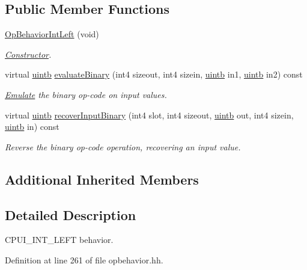 \subsection*{Public Member Functions}
\begin{DoxyCompactItemize}
\item 
\mbox{\hyperlink{class_op_behavior_int_left_ac7fa7af06225f7de57c6bc9d50de9585}{Op\+Behavior\+Int\+Left}} (void)
\begin{DoxyCompactList}\small\item\em \mbox{\hyperlink{class_constructor}{Constructor}}. \end{DoxyCompactList}\item 
virtual \mbox{\hyperlink{types_8h_a2db313c5d32a12b01d26ac9b3bca178f}{uintb}} \mbox{\hyperlink{class_op_behavior_int_left_a573c2bd10543d50ea622b0d3beb2d5c4}{evaluate\+Binary}} (int4 sizeout, int4 sizein, \mbox{\hyperlink{types_8h_a2db313c5d32a12b01d26ac9b3bca178f}{uintb}} in1, \mbox{\hyperlink{types_8h_a2db313c5d32a12b01d26ac9b3bca178f}{uintb}} in2) const
\begin{DoxyCompactList}\small\item\em \mbox{\hyperlink{class_emulate}{Emulate}} the binary op-\/code on input values. \end{DoxyCompactList}\item 
virtual \mbox{\hyperlink{types_8h_a2db313c5d32a12b01d26ac9b3bca178f}{uintb}} \mbox{\hyperlink{class_op_behavior_int_left_a3f4a8ac6409197c7c89cec1ef448bbd8}{recover\+Input\+Binary}} (int4 slot, int4 sizeout, \mbox{\hyperlink{types_8h_a2db313c5d32a12b01d26ac9b3bca178f}{uintb}} out, int4 sizein, \mbox{\hyperlink{types_8h_a2db313c5d32a12b01d26ac9b3bca178f}{uintb}} in) const
\begin{DoxyCompactList}\small\item\em Reverse the binary op-\/code operation, recovering an input value. \end{DoxyCompactList}\end{DoxyCompactItemize}
\subsection*{Additional Inherited Members}


\subsection{Detailed Description}
C\+P\+U\+I\+\_\+\+I\+N\+T\+\_\+\+L\+E\+FT behavior. 

Definition at line 261 of file opbehavior.\+hh.



